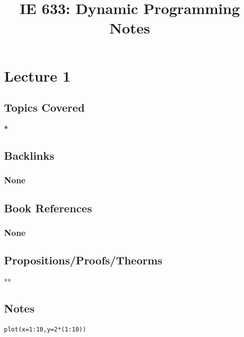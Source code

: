 \documentclass[11pt]{article}
\date{}
\title{IE 633: Dynamic Programming Notes}
\begin{document}
\maketitle

\section*{Lecture 1}
\label{sec:org6eda2d7}
\subsection*{Topics Covered}
\label{sec:orgfc4eba3}
\textbf{*}
\subsection*{Backlinks}
\label{sec:org6cacf1e}
\subsubsection*{None}
\label{sec:orgdba81fe}
\subsection*{Book References}
\label{sec:orgf2124c9}
\subsubsection*{None}
\label{sec:org13ab378}
\subsection*{Propositions/Proofs/Theorms}
\label{sec:org5ec41b5}
**
\subsection*{Notes}
\label{sec:org0e431dd}

\begin{verbatim}
plot(x=1:10,y=2*(1:10))
\end{verbatim}
\end{document}
